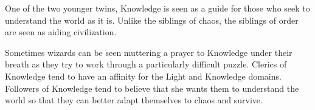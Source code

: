 One of the two younger twins, Knowledge is seen as a guide for those who seek to understand the world as it is.
Unlike the siblings of chaos, the siblings of order are seen as aiding civilization.

Sometimes wizards can be seen muttering a prayer to Knowledge under their breath as they try to work through a particularly difficult puzzle.
Clerics of Knowledge tend to have an affinity for the Light and Knowledge domains.
Followers of Knowledge tend to believe that she wants them to understand the world so that they can better adapt themselves to chaos and survive.
